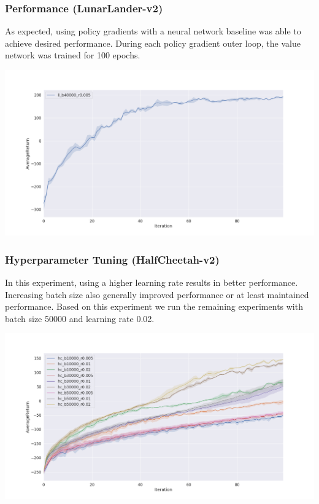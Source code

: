 \documentclass{article}
\begin{document}
    \subsubsection{Performance (LunarLander-v2)}
    As expected, using policy gradients with a neural network baseline was 
    able to achieve desired performance. During each policy gradient outer loop, 
    the value network was trained for 100 epochs.
    \begin{center}
        \noindent\includegraphics[scale=0.3]{lunarLander}
    \end{center}

    \subsubsection{Hyperparameter Tuning (HalfCheetah-v2)}
    In this experiment, using a higher learning rate results in better performance.
    Increasing batch size also generally improved performance or at least 
    maintained performance. Based on this experiment
    we run the remaining experiments with batch size 50000 and learning rate 0.02.

    \begin{center}
        \noindent\includegraphics[scale=0.3]{hyperParamsCheetah}
    \end{center}
\end{document}
